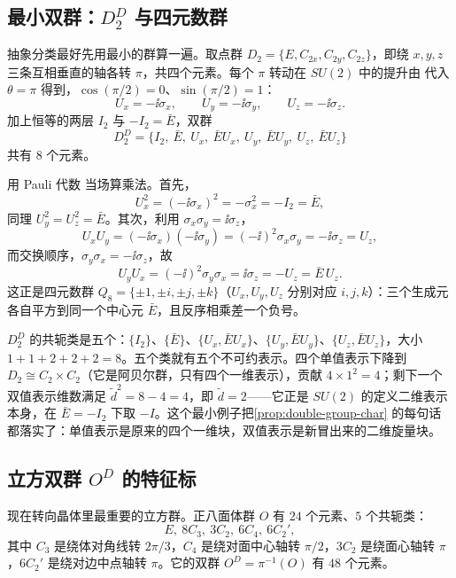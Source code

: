 \subsection{最小双群：$D_2^D$ 与四元数群}
\label{sec:q8-double-group}

抽象分类最好先用最小的群算一遍。取点群 $D_2=\{E,C_{2x},C_{2y},C_{2z}\}$，即绕 $x,y,z$ 三条互相垂直的轴各转 $\pi$，共四个元素。每个 $\pi$ 转动在 $SU(2)$ 中的提升由  代入 $\theta=\pi$ 得到，$\cos(\pi/2)=0$、$\sin(\pi/2)=1$：
\[
U_x=-\ii\sigma_x,\qquad U_y=-\ii\sigma_y,\qquad U_z=-\ii\sigma_z.
\]
加上恒等的两层 $I_2$ 与 $-I_2=\bar E$，双群
\[
D_2^D=\{I_2,\ \bar E,\ U_x,\ \bar EU_x,\ U_y,\ \bar EU_y,\ U_z,\ \bar EU_z\}
\]
共有 $8$ 个元素。

用 Pauli 代数  当场算乘法。首先，
\[
U_x^2=(-\ii\sigma_x)^2=-\sigma_x^2=-I_2=\bar E,
\]
同理 $U_y^2=U_z^2=\bar E$。其次，利用 $\sigma_x\sigma_y=\ii\sigma_z$，
\[
U_xU_y=(-\ii\sigma_x)(-\ii\sigma_y)=(-\ii)^2\sigma_x\sigma_y=-\ii\sigma_z=U_z,
\]
而交换顺序，$\sigma_y\sigma_x=-\ii\sigma_z$，故
\[
U_yU_x=(-\ii)^2\sigma_y\sigma_x=\ii\sigma_z=-U_z=\bar E\,U_z.
\]
这正是四元数群 $Q_8=\{\pm1,\pm i,\pm j,\pm k\}$（$U_x,U_y,U_z$ 分别对应 $i,j,k$）：三个生成元各自平方到同一个中心元 $\bar E$，且反序相乘差一个负号。

$D_2^D$ 的共轭类是五个：$\{I_2\}$、$\{\bar E\}$、$\{U_x,\bar EU_x\}$、$\{U_y,\bar EU_y\}$、$\{U_z,\bar EU_z\}$，大小 $1+1+2+2+2=8$。五个类就有五个不可约表示。四个单值表示下降到 $D_2\cong C_2\times C_2$（它是阿贝尔群，只有四个一维表示），贡献 $4\times1^2=4$；剩下一个双值表示维数满足 $\tilde d^2=8-4=4$，即 $\tilde d=2$——它正是 $SU(2)$ 的定义二维表示本身，在 $\bar E=-I_2$ 下取 $-I$。这个最小例子把\cref{prop:double-group-char} 的每句话都落实了：单值表示是原来的四个一维块，双值表示是新冒出来的二维旋量块。

\subsection{立方双群 $O^D$ 的特征标}
\label{sec:od-double-group}

现在转向晶体里最重要的立方群。正八面体群 $O$ 有 $24$ 个元素、$5$ 个共轭类：
\[
E,\ 8C_3,\ 3C_2,\ 6C_4,\ 6C_2',
\]
其中 $C_3$ 是绕体对角线转 $2\pi/3$，$C_4$ 是绕对面中心轴转 $\pi/2$，$3C_2$ 是绕面心轴转 $\pi$，$6C_2'$ 是绕对边中点轴转 $\pi$。它的双群 $O^D=\pi^{-1}(O)$ 有 $48$ 个元素。

